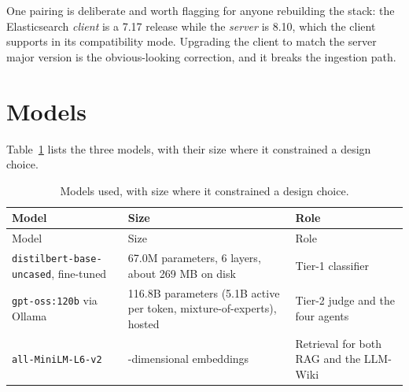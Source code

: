 One pairing is deliberate and worth flagging for anyone rebuilding the stack: the Elasticsearch \emph{client} is a 7.17 release while the \emph{server} is 8.10, which the client supports in its compatibility mode. Upgrading the client to match the server major version is the obvious-looking correction, and it breaks the ingestion path.

\section{Models}\label{appendix-models}

Table~\ref{tab:env-models} lists the three models, with their size where it constrained a design choice.

\begin{longtable}{@{}
  >{\raggedright\arraybackslash}p{}
  >{\raggedright\arraybackslash}p{}
  >{\raggedright\arraybackslash}p{}@{}}
\caption{Models used, with size where it constrained a design choice.}\label{tab:env-models}\tabularnewline
\toprule
Model & Size & Role \\
\midrule
\endfirsthead
\toprule
Model & Size & Role \\
\midrule
\endhead
\bottomrule
\endlastfoot
\texttt{distilbert-base-uncased}, fine-tuned & 67.0M parameters, 6 layers, about 269 MB on disk & Tier-1 classifier \\
\texttt{gpt-oss:120b} via Ollama & 116.8B parameters (5.1B active per token, mixture-of-experts), hosted & Tier-2 judge and the four agents \\
\texttt{all-MiniLM-L6-v2} & 384-dimensional embeddings & Retrieval for both RAG and the LLM-Wiki \\
\end{longtable}
